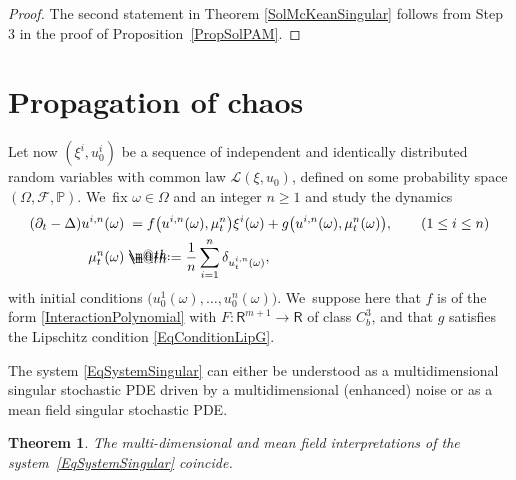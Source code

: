 \documentclass[10pt]{amsart}
\makeatletter
\newtheorem{thm}{Theorem}
\theoremstyle{definition}
\newcommand\bbR{\mathbf{\mathsf{R}}}
\newcommand{\mcF}{\mathcal{F}}
\newcommand{\mcL}{\mathcal{L}}
\newcommand{\bbP}{\mathbb{P}}
\newcommand*{\defeq}{\mathrel{\rlap{%
\raisebox{0.3ex}{$\m@th\cdot$}}%
\raisebox{-0.3ex}{$\m@th\cdot$}}%
=}
\makeatother
\begin{document}
\begin{proof}
The second statement in Theorem \ref{SolMcKeanSingular} follows from Step 3 in the proof of Proposition~\ref{PropSolPAM}.
\end{proof}

\section{Propagation of chaos}
\label{SectionChaos}

Let now $(\xi^i,u_0^i)$ be a sequence of independent and identically distributed random variables with common law $\mcL(\xi,u_0)$, defined on some probability space $(\Omega,\mcF,\bbP)$. We~fix $\omega\in\Omega$ and an integer $n\geq 1$ and study the dynamics
\begin{equation}\label{EqSystemSingular} \begin{split}
(\partial_t-\Delta)u^{i,n}(\omega) &\hphantom{:}= f\bigl(u^{i,n}(\omega), \mu_t^n\bigr)\xi^i(\omega) +g\bigl(u^{i,n}(\omega), \mu_t^n(\omega)\bigr), \qquad (1\leq i\leq n) \\
\mu_t^n(\omega) &\defeq \frac{1}{n}\sum_{i=1}^n\delta_{u^{i,n}_t(\omega)},
\end{split} \end{equation}
with initial conditions $\bigl(u_0^1(\omega),\dots,u_0^n(\omega)\bigr)$. We~suppose here that $f$ is of the form \eqref{InteractionPolynomial} with $F : \bbR^{m+1}\to\bbR$ of class $C^3_b$, and that $g$ satisfies the Lipschitz condition \eqref{EqConditionLipG}.

The system \eqref{EqSystemSingular} can either be understood as a multidimensional singular stochastic PDE driven by a multidimensional (enhanced) noise or as a mean field singular stochastic PDE.

\begin{thm} \label{ThmInterpretation}
The multi-dimensional and mean field interpretations of the system~\eqref{EqSystemSingular} coincide.
\end{thm}
\end{document}
